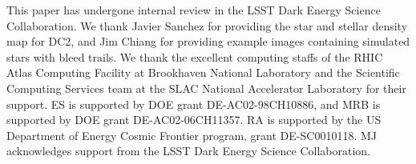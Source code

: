 \documentclass[twocolumn,twocolappendix,astrosym]{openjournal}
\begin{document}
This paper has undergone internal review in the LSST Dark Energy Science
Collaboration. %
We thank Javier Sanchez for providing the star and stellar density map for DC2,
and Jim Chiang for providing example images containing simulated stars
with bleed trails.
We thank the excellent computing staffs of the RHIC Atlas Computing Facility at
Brookhaven National Laboratory and the Scientific Computing Services team at
the SLAC National Accelerator Laboratory for their support.
ES is supported by DOE grant DE-AC02-98CH10886, and MRB is supported by DOE
grant DE-AC02-06CH11357. RA is supported by the US Department of Energy Cosmic
Frontier program, grant DE-SC0010118.  MJ acknowledges support from the LSST
Dark Energy Science Collaboration.



%
%
%
%


\end{document}

